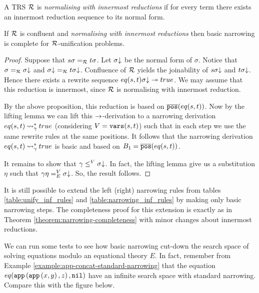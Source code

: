 \begin{definition}
	A TRS $\mathcal{R}$ is \textit{normalising with innermost reductions} if for every term there exists an innermost reduction sequence to its normal form.
\end{definition}

\begin{theorem}
	If $\mathcal{R}$ is confluent and \textit{normalising with innermost reductions} then basic narrowing is complete for $\mathcal{R}$-unification problems.
	\begin{proof}
		Suppose that $s\sigma \eqUnif{\trs} t\sigma$. Let $\sigma\mathord{\downarrow}$ be the normal form of $\sigma$. Notice that $\sigma \eqUnif{\trs} \trsNF{\sigma}$ and $\trsNF{\sigma} \eqUnif{\trs} t\trsNF{\sigma}$. Confluence of $\mathcal{R}$ yields the joinability of $s\sigma\mathord{\downarrow}$ and $t \sigma\mathord{\downarrow}$. Hence there exists a rewrite sequence $eq(s,t)\sigma\mathord{\downarrow} \twoheadrightarrow true$. We may assume that this reduction is innermost, since $\mathcal{R}$ is normalising with innermost reduction.

		By the above proposition, this reduction is based on $\overline{\mathtt{pos}}(eq(s,t))$. Now by the lifting lemma we can lift this $\rightarrow$-derivation to a narrowing derivation $eq(s,t) \mathbin{\rightsquigarrow}_{\gamma}^{*} true$ (considering $V = \mathtt{vars}(s,t)$) such that in each step we use the same rewrite rules at the same positions. It follows that the narrowing derivation $eq(s,t) \mathbin{\rightsquigarrow}_\gamma^* true$ is basic and based on $B_1 = \overline{\mathtt{pos}}(eq(s,t))$.

		It remains to show that $\gamma \leq^V \sigma\mathord{\downarrow}$. In fact, the lifting lemma give us a substitution $\eta$ such that $\gamma \eta \eqUnif{E}^V \trsNF{\sigma}$. So, the result follows.
	\end{proof}
\end{theorem}

\begin{remark}
	It is still possible to extend the left (right) narrowing rules from tables \ref{table:unify_inf_rules} and \ref{table:narrowing_inf_rules} by making only basic narrowing steps. The completeness proof for this extension is exactly as in Theorem \ref{theorem:narrowing-completeness} with minor changes about innermost reductions.
\end{remark}

We can run some tests to see how basic narrowing cut-down the search space of solving equations modulo an equational theory $E$. In fact, remember from Example \ref{example:app-concat-standard-narrowing} that the equation $eq(\mathtt{app}\left(\mathtt{app}\left(x,y\right),z\right), \mathtt{nil})$ have an infinite search space with standard narrowing. Compare this with the figure below.

